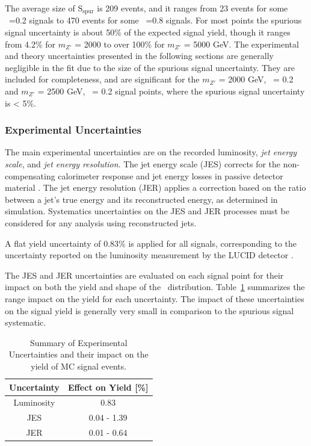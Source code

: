 The average size of $\text{S}_{\text{spur}}$ is 209 events, and it ranges from 23 events for some \rinv~=0.2 signals to 470 events for some \rinv~=0.8 signals.
For most points the spurious signal uncertainty is about 50\% of the expected signal yield, though it ranges from 4.2\% for $m_{Z'}$ = 2000 to over 100\% for $m_{Z'}$ = 5000 GeV.
The experimental and theory uncertainties presented in the following sections are generally negligible in the fit due to the size of the spurious signal uncertainty.
They are included for completeness, and are significant for the $m_{Z'}$ = 2000 GeV, \rinv~= 0.2 and $m_{Z'}$ = 2500 GeV, \rinv~= 0.2 signal points, where the spurious signal uncertainty is < 5\%. 
\subsubsection{Experimental Uncertainties}
The main experimental uncertainties are on the recorded luminosity, \textit{jet energy scale}, and \textit{jet energy resolution}.
The jet energy scale (JES) corrects for the non-compensating calorimeter response and jet energy losses in passive detector material \cite{jes_jer}.
The jet energy resolution (JER) applies a correction based on the ratio between a jet's true energy and its reconstructed energy, as determined in simulation.
Systematics uncertainties on the JES and JER processes must be considered for any analysis using reconstructed jets.

A flat yield uncertainty of 0.83\% is applied for all signals, corresponding to the uncertainty reported on the luminosity measurement by the LUCID detector \cite{lucid_uncertainty}. 

The JES and JER uncertainties are evaluated on each signal point for their impact on both the yield and shape of the \mt~distribution.
Table~\ref{tab:exp_syst} summarizes the range impact on the yield for each uncertainty.
The impact of these uncertainties on the signal yield is generally very small in comparison to the spurious signal systematic.

\begin{table}
\centering
  \begin{tabular}{ |c|c| }
    \hline
    Uncertainty & Effect on Yield [\%] \\
    \hline
     Luminosity & 0.83 \\
     JES & 0.04 - 1.39 \\
     JER & 0.01 - 0.64 \\
    \hline
  \end{tabular}
  \caption{Summary of Experimental Uncertainties and their impact on the yield of MC signal events.}
  \label{tab:exp_syst}
\end{table}

